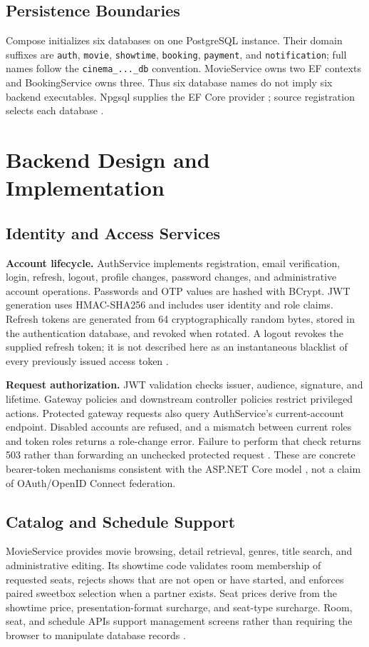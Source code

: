 \documentclass[conference]{IEEEtran}
\newcommand{\code}[1]{\texttt{#1}}
\begin{document}
\subsection{Persistence Boundaries}
Compose initializes six databases on one PostgreSQL instance. Their domain
suffixes are \code{auth}, \code{movie}, \code{showtime}, \code{booking},
\code{payment}, and \code{notification}; full names follow the
\code{cinema\_...\_db} convention.
MovieService owns two EF contexts and BookingService owns three. Thus six
database names do not imply six backend executables. Npgsql supplies the EF
Core provider \cite{npgsql}; source registration selects each database
\cite{auth,movie,booking,deployment}.

\section{Backend Design and Implementation}
\subsection{Identity and Access Services}
\textbf{Account lifecycle.} AuthService implements registration, email verification, login, refresh,
logout, profile changes, password changes, and administrative account operations.
Passwords and OTP values are hashed with BCrypt. JWT generation uses
HMAC-SHA256 and includes user identity and role claims. Refresh tokens are
generated from 64 cryptographically random bytes, stored in the authentication
database, and revoked when rotated. A logout revokes the supplied refresh token;
it is not described here as an instantaneous blacklist of every previously
issued access token \cite{auth}.

\textbf{Request authorization.} JWT validation checks issuer, audience, signature, and lifetime. Gateway policies
and downstream controller policies restrict privileged actions. Protected
gateway requests also query AuthService's current-account endpoint. Disabled
accounts are refused, and a mismatch between current roles and token roles
returns a role-change error. Failure to perform that check returns 503 rather
than forwarding an unchecked protected request \cite{gateway}. These are
concrete bearer-token mechanisms consistent with the ASP.NET Core model
\cite{jwt}, not a claim of OAuth/OpenID Connect federation.

\subsection{Catalog and Schedule Support}
MovieService provides movie browsing, detail retrieval, genres, title search,
and administrative editing. Its showtime code validates room membership of
requested seats, rejects shows that are not open or have started, and enforces
paired sweetbox selection when a partner exists. Seat prices derive from the
showtime price, presentation-format surcharge, and seat-type surcharge.
Room, seat, and schedule APIs support management screens rather than requiring
the browser to manipulate database records \cite{movie,webui}.
\end{document}
